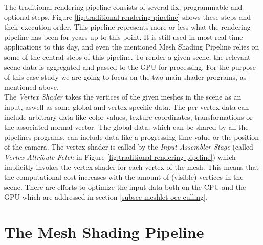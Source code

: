 \noindent
The traditional rendering pipeline consists of several fix, programmable and optional steps.
Figure \ref{fig:traditional-rendering-pipeline} shows these steps and their execution order. 
This pipeline represents more or less what the rendering pipeline has been for years up to this point. 
It is still used in most real time applications to this day, and even the mentioned Mesh Shading 
Pipeline relies on some of the central steps of this pipeline. To render a given scene, the relevant 
scene data is aggregated and passed to the \ac{GPU} for processing. For the purpose of this case study 
we are going to focus on the two main shader programs, as mentioned above. \\


\noindent
The \emph{Vertex Shader} takes the vertices of the given meshes in the scene as an input, aswell as 
some global and vertex specific data. The per-vertex data can include arbitrary data like color values, 
texture coordinates, transformations or the associated normal vector. The global data, which can be shared
by all the pipelines programs, can include data like a progressing time value or the position of the camera.
The vertex shader is called by the \emph{Input Assembler Stage} (called \emph{Vertex Attribute Fetch} in 
Figure \ref{fig:traditional-rendering-pipeline}) which implicitly invokes the vertex shader for each vertex 
of the mesh. This means that the computational cost increases with the amount of (visible) vertices in the scene. 
There are efforts to optimize the input data both on the \ac{CPU} and the \ac{GPU} which are addressed in section 
\ref{subsec-meshlet-occ-culling}.       %






\section{The Mesh Shading Pipeline} \label{sec-mesh-shading-pipeline}

